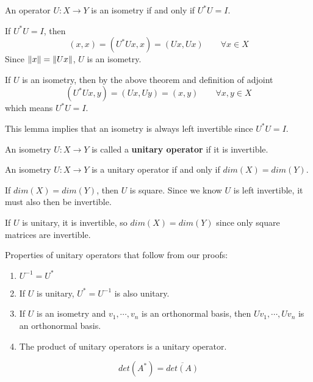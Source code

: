 \begin{lemma}
An operator $U: X \rightarrow Y$ is an isometry if and only if $U^{*}U = I$. 
\end{lemma}

\begin{lproof}
If $U^{*}U = I$, then 
$$(x, x) = (U^{*}Ux, x) = (Ux, Ux) \qquad \forall x \in X$$
Since $\lVert x\rVert = \lVert Ux\rVert$, $U$ is an isometry. 

If $U$ is an isometry, then by the above theorem and definition of adjoint
$$(U^{*} Ux, y) = (Ux, Uy) = (x, y) \qquad \forall x, y \in X$$
which means $U^{*}U = I$. 
\end{lproof}

This lemma implies that an isometry is always left invertible since $U^{*}U = I$. 

\begin{definition}
An isometry $U: X \rightarrow Y$ is called a \textbf{unitary operator} if it is invertible.  
\end{definition}

\begin{lemma}
An isometry $U: X \rightarrow Y$ is a unitary operator if and only if $dim(X) = dim(Y)$. 
\end{lemma}

\begin{lproof}
If $dim(X) = dim(Y)$, then $U$ is square. Since we know $U$ is left invertible, it must also then be invertible. 

If $U$ is unitary, it is invertible, so $dim(X) = dim(Y)$ since only square matrices are invertible. 
\end{lproof}

Properties of unitary operators that follow from our proofs: 
\begin{enumerate}
	\item $U^{-1} = U^{*}$ 
	\item If $U$ is unitary, $U^{*} = U^{-1}$ is also unitary. 
	\item If $U$ is an isometry and $v_{1}, \cdots, v_{n}$ is an orthonormal basis, then $Uv_{1}, \cdots, Uv_{n}$ is an orthonormal basis. 
	\item The product of unitary operators is a unitary operator. 
\end{enumerate}

\begin{lemma}
$$det(A^{*}) = \overline{det(A)}$$
\end{lemma}

